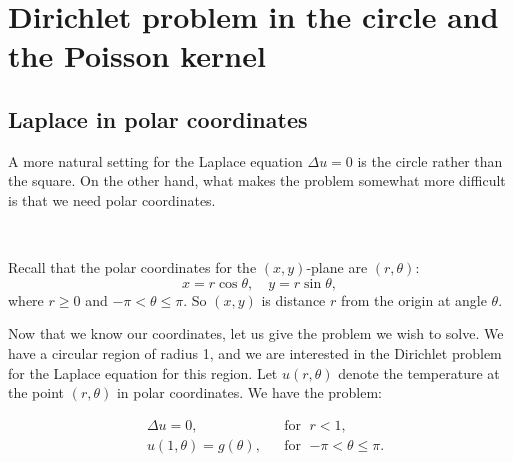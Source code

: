 \documentclass[12pt]{book}
\begin{document}
%


\sectionnewpage
\section{Dirichlet problem in the circle and the Poisson kernel}
\label{dirichdisc:section}


\subsection{Laplace in polar coordinates}

A more natural setting for the Laplace equation $\Delta u = 0$
is the circle rather than the square.  On the other hand, what makes the
problem somewhat more difficult is that we need polar coordinates.

\begin{diffyfloatingfigurer}{1.3in}{1.5in}
\noindent
{}
\\
\end{diffyfloatingfigurer}
Recall that the polar coordinates for the $(x,y)$-plane are $(r,\theta)$: 
\begin{equation*}
x = r \cos \theta , \quad y = r \sin \theta ,
\end{equation*}
where $r \geq 0$ and $-\pi < \theta \leq \pi$.  So $(x,y)$ is
distance $r$ from the origin at angle $\theta$.

Now that we know our coordinates, let us give the problem we wish
to solve.  We have a circular region of radius 1, and we are interested
in the Dirichlet problem for the Laplace equation for this region.  Let
$u(r,\theta)$ denote the temperature at the point $(r,\theta)$ in polar
coordinates.  We have the problem:
\begin{diffyfloatingfigurer}{2.4in}{2.7in}
\noindent
{}
\end{diffyfloatingfigurer}
\begin{equation} \label{dirichdisc:theprobeq}
\begin{aligned}
& \Delta u = 0 , & & \text{for } \; r < 1, \\
& u(1,\theta) = g(\theta), & & \text{for } \; {-\pi} < \theta \leq \pi.
\end{aligned}
\end{equation}
\end{document}
